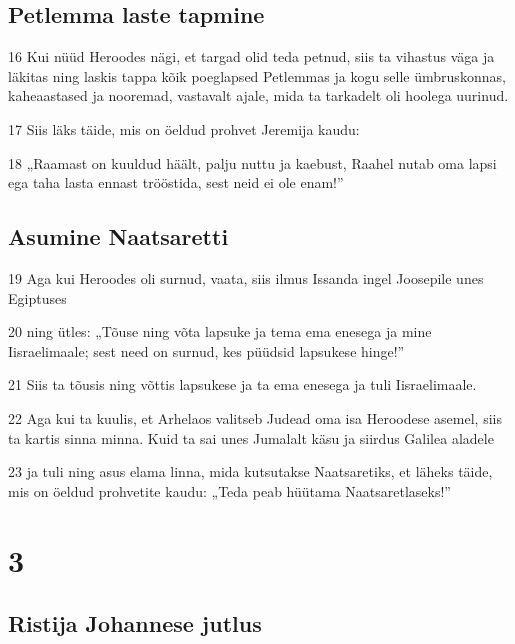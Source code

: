 \section*{Petlemma laste tapmine}

\par 16 Kui nüüd Heroodes nägi, et targad olid teda petnud, siis ta vihastus väga ja läkitas ning laskis tappa kõik poeglapsed Petlemmas ja kogu selle ümbruskonnas, kaheaastased ja nooremad, vastavalt ajale, mida ta tarkadelt oli hoolega uurinud.
\par 17 Siis läks täide, mis on öeldud prohvet Jeremija kaudu:
\par 18 „Raamast on kuuldud häält, palju nuttu ja kaebust, Raahel nutab oma lapsi ega taha lasta ennast trööstida, sest neid ei ole enam!”

\section*{Asumine Naatsaretti}

\par 19 Aga kui Heroodes oli surnud, vaata, siis ilmus Issanda ingel Joosepile unes Egiptuses
\par 20 ning ütles: „Tõuse ning võta lapsuke ja tema ema enesega ja mine Iisraelimaale; sest need on surnud, kes püüdsid lapsukese hinge!”
\par 21 Siis ta tõusis ning võttis lapsukese ja ta ema enesega ja tuli Iisraelimaale.
\par 22 Aga kui ta kuulis, et Arhelaos valitseb Judead oma isa Heroodese asemel, siis ta kartis sinna minna. Kuid ta sai unes Jumalalt käsu ja siirdus Galilea aladele
\par 23 ja tuli ning asus elama linna, mida kutsutakse Naatsaretiks, et läheks täide, mis on öeldud prohvetite kaudu: „Teda peab hüütama Naatsaretlaseks!”


\chapter{3}

\section*{Ristija Johannese jutlus}

